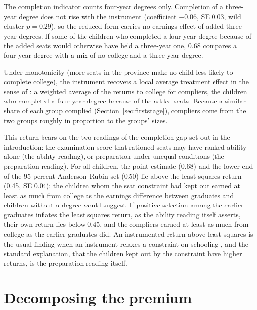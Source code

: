 \documentclass[11pt]{article}
\begin{document}
The completion indicator counts four-year degrees only. Completion of a three-year degree does not rise with the instrument (coefficient $-0.06$, SE 0.03, wild cluster $p = 0.29$), so the reduced form carries no earnings effect of added three-year degrees. If some of the children who completed a four-year degree because of the added seats would otherwise have held a three-year one, 0.68 compares a four-year degree with a mix of no college and a three-year degree.

Under monotonicity (more seats in the province make no child less likely to complete college), the instrument recovers a local average treatment effect in the sense of \citet{ImbensAngrist1994}: a weighted average of the returns to college for compliers, the children who completed a four-year degree because of the added seats. Because a similar share of each group complied (Section~\ref{sec:firststage}), compliers come from the two groups roughly in proportion to the groups' sizes.

This return bears on the two readings of the completion gap set out in the introduction: the examination score that rationed seats may have ranked ability alone (the ability reading), or preparation under unequal conditions (the preparation reading). For all children, the point estimate (0.68) and the lower end of the 95 percent Anderson--Rubin set (0.50) lie above the least squares return (0.45, SE 0.04): the children whom the seat constraint had kept out earned at least as much from college as the earnings difference between graduates and children without a degree would suggest. If positive selection among the earlier graduates inflates the least squares return, as the ability reading itself asserts, their own return lies below 0.45, and the compliers earned at least as much from college as the earlier graduates did. An instrumented return above least squares is the usual finding when an instrument relaxes a constraint on schooling \citep{Card2001}, and the standard explanation, that the children kept out by the constraint have higher returns, is the preparation reading itself.

\section{Decomposing the premium}
\label{sec:mediation}
\end{document}
